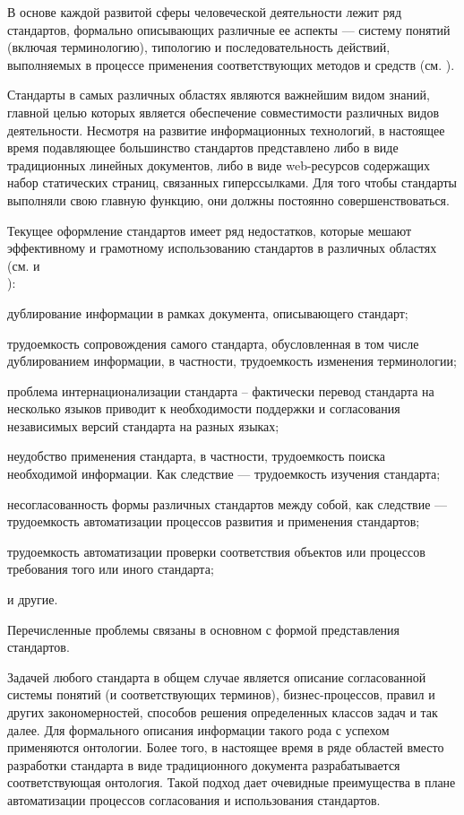 В основе каждой развитой сферы человеческой деятельности лежит ряд стандартов, формально описывающих различные ее аспекты --- систему понятий (включая терминологию), типологию и последовательность действий, выполняемых в процессе применения соответствующих методов и средств (см. ).

Стандарты в самых различных областях являются важнейшим видом знаний, главной целью которых является обеспечение совместимости различных видов деятельности.  Несмотря на развитие информационных технологий, в настоящее время подавляющее большинство стандартов представлено либо в виде традиционных линейных документов, либо в виде web-ресурсов содержащих набор статических страниц, связанных гиперссылками. Для того чтобы стандарты выполняли свою главную функцию, они должны постоянно совершенствоваться. 

Текущее оформление стандартов имеет ряд недостатков, которые мешают эффективному и грамотному использованию стандартов в различных областях (см.  и \\ ):
\begin{textitemize}
	\item дублирование информации в рамках документа, описывающего стандарт;
	\item трудоемкость сопровождения самого стандарта, обусловленная в том числе дублированием информации, в частности, трудоемкость изменения терминологии;
	\item проблема интернационализации стандарта -- фактически перевод стандарта на несколько языков приводит к необходимости поддержки и согласования независимых версий стандарта на разных языках;
	\item неудобство применения стандарта, в частности, трудоемкость поиска необходимой информации. Как следствие --- трудоемкость изучения стандарта;
	\item несогласованность формы различных стандартов между собой, как следствие --- трудоемкость автоматизации процессов развития и применения стандартов;
	\item трудоемкость автоматизации проверки соответствия объектов или процессов требования того или иного стандарта;
	\item  и другие.
\end{textitemize}

Перечисленные проблемы связаны в основном с формой представления стандартов. 

Задачей любого стандарта в общем случае является описание согласованной системы понятий (и соответствующих терминов), бизнес-процессов, правил и других закономерностей, способов решения определенных классов задач и так далее. Для формального описания информации такого рода с успехом применяются онтологии. Более того, в настоящее время в ряде областей вместо разработки стандарта в виде традиционного документа разрабатывается соответствующая онтология. Такой подход дает очевидные преимущества в плане автоматизации процессов согласования и использования стандартов.

